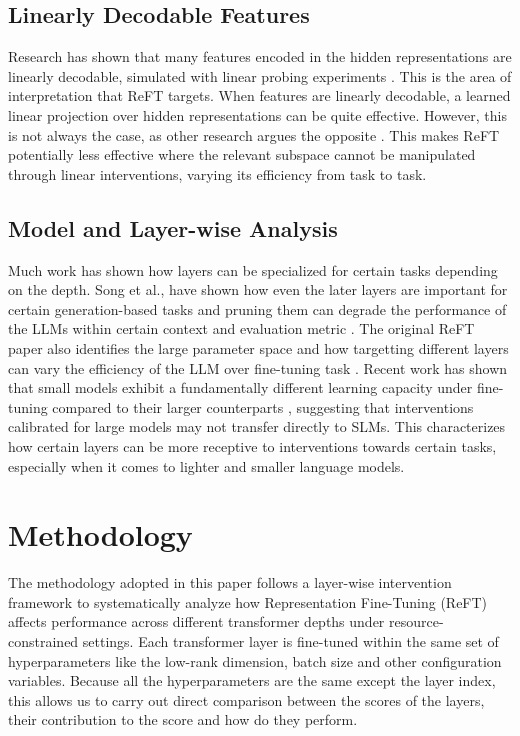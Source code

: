 \documentclass[conference]{IEEEtran}
\begin{document}
	\subsection{Linearly Decodable Features}
	Research has shown that many features encoded in the hidden representations are linearly decodable, simulated with linear probing experiments \cite{gurnee2023space}. This is the area of interpretation that ReFT targets. When features are linearly decodable, a learned linear projection over hidden representations can be quite effective. However, this is not always the case, as other research argues the opposite \cite{engels2024not}. This makes ReFT potentially less effective where the relevant subspace cannot be manipulated through linear interventions, varying its efficiency from task to task.
	
	\subsection{Model and Layer-wise Analysis}
	Much work has shown how layers can be specialized for certain tasks depending on the depth. Song et al., have shown how even the later layers are important for certain generation-based tasks and pruning them can degrade the performance of the LLMs within certain context and evaluation metric \cite{song2025demystifying}. The original ReFT paper also identifies the large parameter space and how targetting different layers can vary the efficiency of the LLM over fine-tuning task \cite{wu2024reft}. Recent work has shown that small models exhibit a fundamentally different learning capacity under fine-tuning compared to their larger counterparts \cite{li2025small}, suggesting that interventions calibrated for large models may not transfer directly to SLMs. This characterizes how certain layers can be more receptive to interventions towards certain tasks, especially when it comes to lighter and smaller language models.
	
	\section{Methodology}
	The methodology adopted in this paper follows a layer-wise intervention framework to systematically analyze how Representation Fine-Tuning (ReFT) affects performance across different transformer depths under resource-constrained settings. Each transformer layer is fine-tuned within the same set of hyperparameters like the low-rank dimension, batch size and other configuration variables. Because all the hyperparameters are the same except the layer index, this allows us to carry out direct comparison between the scores of the layers, their contribution to the score and how do they perform.
	
\end{document}

